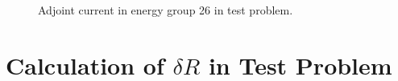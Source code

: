 \begin{figure}
\begin{minipage}{0.49\linewidth}
    \caption{Adjoint current in energy group 26 in test problem.}
    \label{fig:testprob:current_adj_g26}
  \end{minipage}
\end{figure}

\section{Calculation of $\delta R$ in Test Problem}
\label{sec:bg:tp:dr}

%
